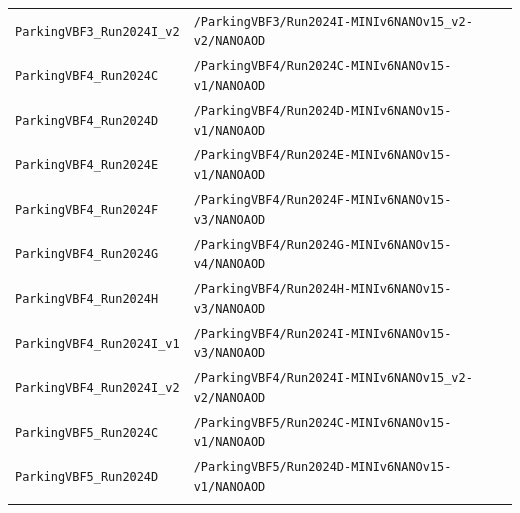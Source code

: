 \begin{longtable}{@{}>{\RaggedRight\arraybackslash}p{} >{\RaggedRight\arraybackslash}p{}@{}}
\texttt{ParkingVBF3\_\allowbreak{}Run2024I\_\allowbreak{}v2} & \texttt{/\allowbreak{}ParkingVBF3/\allowbreak{}Run2024I-\allowbreak{}MINIv6NANOv15\_\allowbreak{}v2-\allowbreak{}v2/\allowbreak{}NANOAOD} \\
\addlinespace[2pt]
\texttt{ParkingVBF4\_\allowbreak{}Run2024C} & \texttt{/\allowbreak{}ParkingVBF4/\allowbreak{}Run2024C-\allowbreak{}MINIv6NANOv15-\allowbreak{}v1/\allowbreak{}NANOAOD} \\
\addlinespace[2pt]
\texttt{ParkingVBF4\_\allowbreak{}Run2024D} & \texttt{/\allowbreak{}ParkingVBF4/\allowbreak{}Run2024D-\allowbreak{}MINIv6NANOv15-\allowbreak{}v1/\allowbreak{}NANOAOD} \\
\addlinespace[2pt]
\texttt{ParkingVBF4\_\allowbreak{}Run2024E} & \texttt{/\allowbreak{}ParkingVBF4/\allowbreak{}Run2024E-\allowbreak{}MINIv6NANOv15-\allowbreak{}v1/\allowbreak{}NANOAOD} \\
\addlinespace[2pt]
\texttt{ParkingVBF4\_\allowbreak{}Run2024F} & \texttt{/\allowbreak{}ParkingVBF4/\allowbreak{}Run2024F-\allowbreak{}MINIv6NANOv15-\allowbreak{}v3/\allowbreak{}NANOAOD} \\
\addlinespace[2pt]
\texttt{ParkingVBF4\_\allowbreak{}Run2024G} & \texttt{/\allowbreak{}ParkingVBF4/\allowbreak{}Run2024G-\allowbreak{}MINIv6NANOv15-\allowbreak{}v4/\allowbreak{}NANOAOD} \\
\addlinespace[2pt]
\texttt{ParkingVBF4\_\allowbreak{}Run2024H} & \texttt{/\allowbreak{}ParkingVBF4/\allowbreak{}Run2024H-\allowbreak{}MINIv6NANOv15-\allowbreak{}v3/\allowbreak{}NANOAOD} \\
\addlinespace[2pt]
\texttt{ParkingVBF4\_\allowbreak{}Run2024I\_\allowbreak{}v1} & \texttt{/\allowbreak{}ParkingVBF4/\allowbreak{}Run2024I-\allowbreak{}MINIv6NANOv15-\allowbreak{}v3/\allowbreak{}NANOAOD} \\
\addlinespace[2pt]
\texttt{ParkingVBF4\_\allowbreak{}Run2024I\_\allowbreak{}v2} & \texttt{/\allowbreak{}ParkingVBF4/\allowbreak{}Run2024I-\allowbreak{}MINIv6NANOv15\_\allowbreak{}v2-\allowbreak{}v2/\allowbreak{}NANOAOD} \\
\addlinespace[2pt]
\texttt{ParkingVBF5\_\allowbreak{}Run2024C} & \texttt{/\allowbreak{}ParkingVBF5/\allowbreak{}Run2024C-\allowbreak{}MINIv6NANOv15-\allowbreak{}v1/\allowbreak{}NANOAOD} \\
\addlinespace[2pt]
\texttt{ParkingVBF5\_\allowbreak{}Run2024D} & \texttt{/\allowbreak{}ParkingVBF5/\allowbreak{}Run2024D-\allowbreak{}MINIv6NANOv15-\allowbreak{}v1/\allowbreak{}NANOAOD} \\
\addlinespace[2pt]

\end{longtable}
